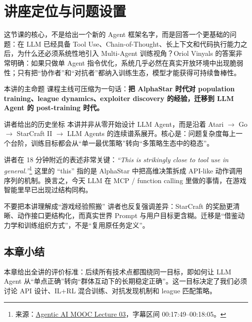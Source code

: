 \section{讲座定位与问题设置}

这节课的核心，不是给出一个新的 Agent 框架名字，而是回答一个更基础的问题：在 LLM 已经具备 Tool Use、Chain-of-Thought、长上下文和代码执行能力之后，为什么还必须系统性地引入 Multi-Agent 训练视角？Oriol Vinyals 的答案非常明确：如果只做单 Agent 指令优化，系统几乎必然在真实开放环境中出现脆弱性；只有把``协作者''和``对抗者''都纳入训练生态，模型才能获得可持续鲁棒性。

\begin{importantbox}{本讲的主命题}
课程主线可压缩为一句话：\textbf{把 AlphaStar 时代对 population training、league dynamics、exploiter discovery 的经验，迁移到 LLM Agent 的 post-training 时代。}
\end{importantbox}

\begin{knowledgebox}{讲者给出的历史坐标}
本讲并非从零开始设计 LLM Agent，而是沿着 Atari $\rightarrow$ Go $\rightarrow$ StarCraft II $\rightarrow$ LLM Agents 的连续谱系展开。核心是：问题复杂度每上一个台阶，训练目标都会从``单一最优策略''转向``多策略生态中的稳态''。
\end{knowledgebox}

讲者在 18 分钟附近的表述非常关键：\textit{``This is strikingly close to tool use in general.''}\footnote{来源：\href{https://www.youtube.com/watch?v=ntjOxjZMaac}{Agentic AI MOOC Lecture 03}，字幕区间 00:17:49--00:18:05。} 这里的 ``this'' 指的是 AlphaStar 中把高维决策拆成 API-like 动作调用序列的机制。换言之，今天 LLM 在 MCP / function calling 里做的事情，在游戏智能里早已出现过结构同构。

\begin{warningbox}{不要把本讲理解成``游戏经验照搬''}
讲者也反复强调差异：StarCraft 的奖励更清晰、动作接口更结构化，而真实世界 Prompt 与用户目标更含糊。迁移是``借鉴动力学和训练组织方式''，不是``复用原任务定义''。
\end{warningbox}

\subsection{本章小结}
本章给出全讲的评价标准：后续所有技术点都围绕同一目标，即如何让 LLM Agent 从``单点正确''转向``群体互动下的长期稳定正确''。这一目标决定了我们必须讨论 API 设计、IL+RL 混合训练、对抗发现机制和 league 匹配策略。

